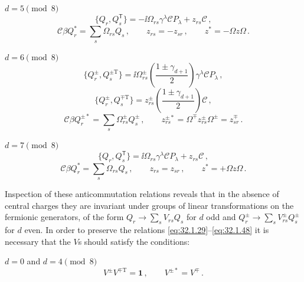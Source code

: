 \medskip
\noindent \(d=5\pmod 8\)
\begin{equation}
  \{Q_r,Q_s^{\mathsf T}\}
  =-\ii\Omega_{rs}\gamma^\lambda\mathcal C P_\lambda
   +z_{rs}\mathcal C\,,
  \tag{32.1.42}\label{eq:32.1.42}
\end{equation}
\begin{equation}
  \mathcal C\beta Q_r^*=\sum_s\Omega_{rs}Q_s\,,
  \qquad
  z_{rs}=-z_{sr}\,,
  \qquad
  z^*=-\Omega z\Omega\,.
  \tag{32.1.43}\label{eq:32.1.43}
\end{equation}

\medskip
\noindent \(d=6\pmod 8\)
\begin{equation}
  \{Q_r^\pm,Q_s^{\pm\mathrm T}\}
  =\ii\Omega_{rs}^{\pm}
  \left(\frac{1\pm\gamma_{d+1}}{2}\right)
  \gamma^\lambda\mathcal C P_\lambda\,,
  \tag{32.1.44}\label{eq:32.1.44}
\end{equation}
\begin{equation}
  \{Q_r^\pm,Q_s^{\mp\mathrm T}\}
  =z_{rs}^{\pm}
  \left(\frac{1\pm\gamma_{d+1}}{2}\right)\mathcal C\,,
  \tag{32.1.45}\label{eq:32.1.45}
\end{equation}
\begin{equation}
  \mathcal C\beta Q_r^{\pm*}
  =\sum_s\Omega_{rs}^{\pm}Q_s^\pm\,,
  \qquad
  z_{rs}^{\pm*}
  =\Omega^\mp z_{rs}^{\pm}\Omega^\pm
  =z_{sr}^{\mp}\,.
  \tag{32.1.46}\label{eq:32.1.46}
\end{equation}

\medskip
\noindent \(d=7\pmod 8\)
\begin{equation}
  \{Q_r,Q_s^{\mathsf T}\}
  =\ii\Omega_{rs}\gamma^\lambda\mathcal C P_\lambda
   +z_{rs}\mathcal C\,,
  \tag{32.1.47}\label{eq:32.1.47}
\end{equation}
\begin{equation}
  \mathcal C\beta Q_r^*=\sum_s\Omega_{rs}Q_s\,,
  \qquad
  z_{rs}=z_{sr}\,,
  \qquad
  z^*=+\Omega z\Omega\,.
  \tag{32.1.48}\label{eq:32.1.48}
\end{equation}

Inspection of these anticommutation relations reveals that in the absence
of central charges they are invariant under groups of linear transformations
on the fermionic generators, of the form
\(Q_r\longrightarrow\sum_sV_{rs}Q_s\) for \(d\) odd and
\(Q_r^\pm\longrightarrow\sum_sV_{rs}^\pm Q_s^\pm\) for \(d\) even. In
order to preserve the relations \eqref{eq:32.1.29}--\eqref{eq:32.1.48} it
is necessary that the \(V\)s should satisfy the conditions:

\medskip
\noindent \(d=0\) and \(d=4\pmod 8\)
\begin{equation}
  V^\pm V^{\mp\mathrm T}=\mathbf{1}\,,
  \qquad V^{\pm*}=V^\mp\,.
  \tag{32.1.49}\label{eq:32.1.49}
\end{equation}

